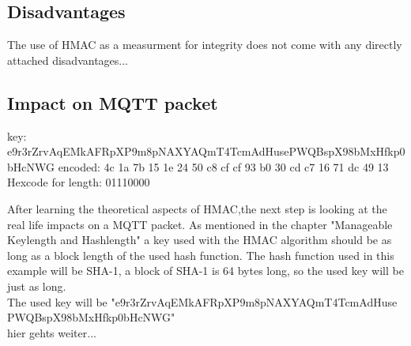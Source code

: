 \subsection{Disadvantages}
The use of HMAC as a measurment for integrity does not come with any directly attached disadvantages...

\subsection{Impact on MQTT packet}
key: e9r3rZrvAqEMkAFRpXP9m8pNAXYAQmT4TcmAdHusePWQBspX98bMxHfkp0bHcNWG
encoded: 4c 1a 7b 15 1e 24 50 c8 cf cf 93 b0 30 cd c7 16 71 dc 49 13
Hexcode for length: 01110000

After learning the theoretical aspects of HMAC,the next step is looking at the real life impacts on a MQTT packet.
As mentioned in the chapter "Manageable Keylength and Hashlength" a key used with the HMAC algorithm should be as long as a block length of the used hash function. The hash function used in this example will be SHA-1, a block of SHA-1 is 64 bytes long, so the used key will be just as long. \\ The used key will be "e9r3rZrvAqEMkAFRpXP9m8pNAXYAQmT4TcmAdHuse\\PWQBspX98bMxHfkp0bHcNWG" \\
hier gehts weiter...